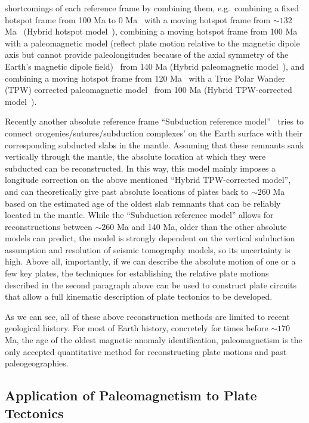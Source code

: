 shortcomings of each reference frame by combining them, e.g.\ combining a fixed
hotspot frame from 100 Ma to 0 Ma~\citep{M93} with a moving hotspot frame from
${\sim}132$ Ma~\citep{O05} (Hybrid hotspot model~\citep{Sh12}),
combining a moving hotspot frame from 100 Ma~\citep{O05} with a
paleomagnetic model (reflect plate motion relative to the magnetic dipole axis
but cannot provide paleolongitudes because of the axial symmetry of the Earth's
magnetic dipole field)~\citep{T08} from 140 Ma (Hybrid
paleomagnetic model~\citep{Sh12}), and combining a moving hotspot frame from
120 Ma~\citep{O05} with a True Polar Wander (TPW) corrected
paleomagnetic model~\citep{S08} from 100 Ma (Hybrid TPW-corrected
model~\citep{Sh12}).

Recently another absolute reference frame ``Subduction reference
model''~\citep{v10} tries to connect orogenies/sutures/subduction complexes' on
the Earth surface with their corresponding subducted slabs in the mantle.
Assuming that these remnants sank vertically through the mantle, the absolute
location at which they were subducted can be reconstructed. In this way, this
model mainly imposes a longitude correction on the above mentioned ``Hybrid
TPW-corrected model'', and can theoretically give past absolute locations of
plates back to ${\sim}260$ Ma based on the estimated age of the oldest slab
remnants that can be reliably located in the mantle. While the ``Subduction
reference model'' allows for reconstructions between ${\sim}260$ Ma and 140 Ma,
older than the other absolute models can predict, the model is strongly
dependent on the vertical subduction assumption and resolution of seismic
tomography models, so its uncertainty is high. Above all, importantly, if we can
describe the absolute motion of one or a few key plates, the techniques for
establishing the relative plate motions described in the second paragraph above
can be used to construct plate circuits that allow a full kinematic description
of plate tectonics to be developed.

As we can see, all of these above reconstruction methods are limited to recent
geological history. For most of Earth history, concretely for times before
${\sim}170$ Ma, the age of the oldest magnetic anomaly identification,
paleomagnetism is the only accepted quantitative method for reconstructing plate
motions and past paleogeographies.

\subsection{Application of Paleomagnetism to Plate
Tectonics}\label{sec:applPlateTec}

